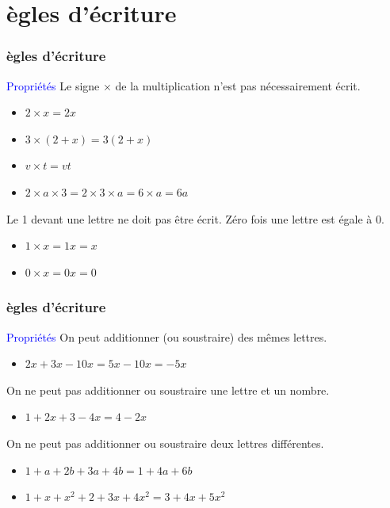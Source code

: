\documentclass{beamer}
\begin{document}
\section{ ègles d'écriture}

\begin{frame}
  \frametitle{ ègles d'écriture}
  \begin{block}{\textcolor{blue}{Propriétés}}
    Le signe $\times$ de la multiplication n'est pas nécessairement écrit.
    \begin{itemize}
    \item $2 \times x          = 2x$
    \item $3 \times (2 + x)    = 3(2 + x)$
    \item $v \times t          = vt$
    \item $2 \times a \times 3 = 2 \times 3 \times a = 6 \times a = 6a$
    \end{itemize}
    Le 1 devant une lettre ne doit pas être écrit. Zéro fois une lettre est égale à 0. 
    \begin{itemize}
    \item $1 \times x          = 1x = x$
    \item $0 \times x          = 0x = 0$
    \end{itemize}
  \end{block}
  \end{frame}

\begin{frame}
  \frametitle{ ègles d'écriture}
  \begin{block}{\textcolor{blue}{Propriétés}}
    On peut additionner (ou soustraire) des mêmes lettres.
    \begin{itemize}
    \item $2x + 3x - 10x = 5x - 10x = -5x$
    \end{itemize}
    On ne peut pas additionner ou soustraire une lettre et un nombre.
    \begin{itemize}
    \item $1 + 2x + 3 - 4x = 4 - 2x$
    \end{itemize}
    On ne peut pas additionner ou soustraire deux lettres différentes.
    \begin{itemize} 
    \item $1 + a + 2b + 3a +4b = 1 + 4a + 6b$
    \item $1 + x + x^2 + 2 + 3x + 4x^2 = 3 + 4x + 5x^2$
    \end{itemize}
  \end{block}  
\end{frame}
\end{document}
